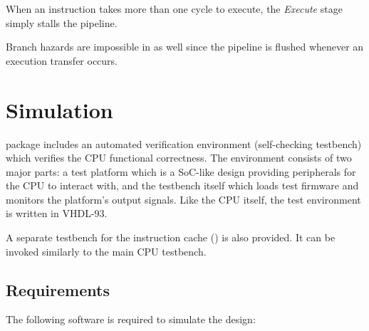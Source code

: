 \documentclass[a4paper,12pt,twoside,extrafontsizes]{memoir}
\begin{document}
When an instruction takes more than one cycle to execute, the \emph{Execute} stage simply stalls the pipeline.

Branch hazards are impossible in \lxp{} as well since the pipeline is flushed whenever an execution transfer occurs.

\chapter{Simulation}
\label{ch:simulation}

\lxp{} package includes an automated verification environment (self-checking testbench) which verifies the \lxp{} CPU functional correctness. The environment consists of two major parts: a test platform which is a SoC-like design providing peripherals for the CPU to interact with, and the testbench itself which loads test firmware and monitors the platform's output signals. Like the CPU itself, the test environment is written in VHDL-93.

A separate testbench for the instruction cache () is also provided. It can be invoked similarly to the main CPU testbench.

\section{Requirements}

The following software is required to simulate the \lxp{} design:
\end{document}
